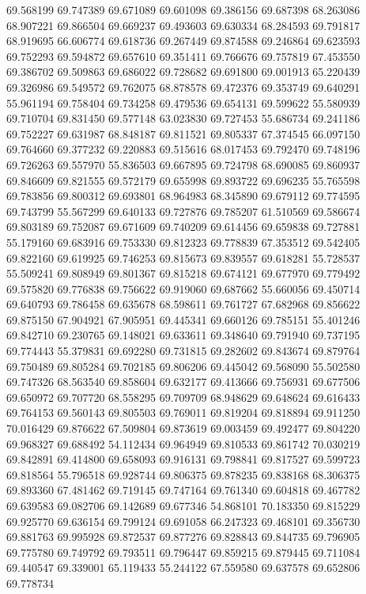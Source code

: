 69.568199
69.747389
69.671089
69.601098
69.386156
69.687398
68.263086
68.907221
69.866504
69.669237
69.493603
69.630334
68.284593
69.791817
68.919695
66.606774
69.618736
69.267449
69.874588
69.246864
69.623593
69.752293
69.594872
69.657610
69.351411
69.766676
69.757819
67.453550
69.386702
69.509863
69.686022
69.728682
69.691800
69.001913
65.220439
69.326986
69.549572
69.762075
68.878578
69.472376
69.353749
69.640291
55.961194
69.758404
69.734258
69.479536
69.654131
69.599622
55.580939
69.710704
69.831450
69.577148
63.023830
69.727453
55.686734
69.241186
69.752227
69.631987
68.848187
69.811521
69.805337
67.374545
66.097150
69.764660
69.377232
69.220883
69.515616
68.017453
69.792470
69.748196
69.726263
69.557970
55.836503
69.667895
69.724798
68.690085
69.860937
69.846609
69.821555
69.572179
69.655998
69.893722
69.696235
55.765598
69.783856
69.800312
69.693801
68.964983
68.345890
69.679112
69.774595
69.743799
55.567299
69.640133
69.727876
69.785207
61.510569
69.586674
69.803189
69.752087
69.671609
69.740209
69.614456
69.659838
69.727881
55.179160
69.683916
69.753330
69.812323
69.778839
67.353512
69.542405
69.822160
69.619925
69.746253
69.815673
69.839557
69.618281
55.728537
55.509241
69.808949
69.801367
69.815218
69.674121
69.677970
69.779492
69.575820
69.776838
69.756622
69.919060
69.687662
55.660056
69.450714
69.640793
69.786458
69.635678
68.598611
69.761727
67.682968
69.856622
69.875150
67.904921
67.905951
69.445341
69.660126
69.785151
55.401246
69.842710
69.230765
69.148021
69.633611
69.348640
69.791940
69.737195
69.774443
55.379831
69.692280
69.731815
69.282602
69.843674
69.879764
69.750489
69.805284
69.702185
69.806206
69.445042
69.568090
55.502580
69.747326
68.563540
69.858604
69.632177
69.413666
69.756931
69.677506
69.650972
69.707720
68.558295
69.709709
68.948629
69.648624
69.616433
69.764153
69.560143
69.805503
69.769011
69.819204
69.818894
69.911250
70.016429
69.876622
67.509804
69.873619
69.003459
69.492477
69.804220
69.968327
69.688492
54.112434
69.964949
69.810533
69.861742
70.030219
69.842891
69.414800
69.658093
69.916131
69.798841
69.817527
69.599723
69.818564
55.796518
69.928744
69.806375
69.878235
69.838168
68.306375
69.893360
67.481462
69.719145
69.747164
69.761340
69.604818
69.467782
69.639583
69.082706
69.142689
69.677346
54.868101
70.183350
69.815229
69.925770
69.636154
69.799124
69.691058
66.247323
69.468101
69.356730
69.881763
69.995928
69.872537
69.877276
69.828843
69.844735
69.796905
69.775780
69.749792
69.793511
69.796447
69.859215
69.879445
69.711084
69.440547
69.339001
65.119433
55.244122
67.559580
69.637578
69.652806
69.778734
